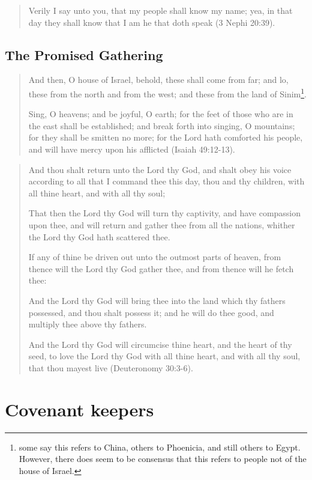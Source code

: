 \begin{quotation}
Verily I say unto you, that my people shall know my name; yea, in that day they shall know that I am he that doth speak (3 Nephi 20:39).
\end{quotation}

\subsection{The Promised Gathering}

\begin{quotation}
And then, O house of Israel, behold, these shall come from far; and lo, these from the north and from the west; and these from the land of Sinim\footnote{some say this refers to China, others to Phoenicia, and still others to Egypt. However, there does seem to be consensus that this refers to people not of the house of Israel.}.

Sing, O heavens; and be joyful, O earth; for the feet of those who are in the east shall be established; and break forth into singing, O mountains; for they shall be smitten no more; for the Lord hath comforted his people, and will have mercy upon his afflicted (Isaiah 49:12-13).
\end{quotation}

\begin{quotation}
And thou shalt return unto the Lord thy God, and shalt obey his voice according to all that I command thee this day, thou and thy children, with all thine heart, and with all thy soul;

That then the Lord thy God will turn thy captivity, and have compassion upon thee, and will return and gather thee from all the nations, whither the Lord thy God hath scattered thee. 

If any of thine be driven out unto the outmost parts of heaven, from thence will the Lord thy God gather thee, and from thence will he fetch thee:

And the Lord thy God will bring thee into the land which thy fathers possessed, and thou shalt possess it; and he will do thee good, and multiply thee above thy fathers.

And the Lord thy God will circumcise thine heart, and the heart of thy seed, to love the Lord thy God with all thine heart, and with all thy soul, that thou mayest live (Deuteronomy 30:3-6).
\end{quotation}

\section{Covenant keepers}

